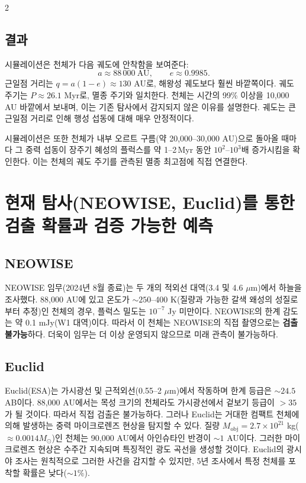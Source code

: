 \documentclass[12pt,a4paper]{article}
\begin{document}
\begin{multicols}{2}
		\subsection{결과}
		시뮬레이션은 천체가 다음 궤도에 안착함을 보여준다:
		\[
		a \approx 88\,000\ \text{AU},\qquad e \approx 0.9985.
		\]
		근일점 거리는 \(q = a(1-e) \approx 130\) AU로, 해왕성 궤도보다 훨씬 바깥쪽이다. 궤도 주기는 \(P \approx 26.1\) Myr로, 멸종 주기와 일치한다. 천체는 시간의 99\% 이상을 10,000 AU 바깥에서 보내며, 이는 기존 탐사에서 감지되지 않은 이유를 설명한다. 궤도는 큰 근일점 거리로 인해 행성 섭동에 대해 매우 안정적이다.
		
		시뮬레이션은 또한 천체가 내부 오르트 구름(약 20,000–30,000 AU)으로 돌아올 때마다 그 중력 섭동이 장주기 혜성의 플럭스를 약 1–2 Myr 동안 \(10^2\)–\(10^3\)배 증가시킴을 확인한다. 이는 천체의 궤도 주기를 관측된 멸종 최고점에 직접 연결한다.
		
		\section{현재 탐사(NEOWISE, Euclid)를 통한 검출 확률과 검증 가능한 예측}
		\subsection{NEOWISE}
		NEOWISE 임무(2024년 8월 종료)는 두 개의 적외선 대역(3.4 및 4.6 \(\mu\)m)에서 하늘을 조사했다. 88,000 AU에 있고 온도가 \(\sim 250\)–400 K(질량과 가능한 갈색 왜성의 성질로부터 추정)인 천체의 경우, 플럭스 밀도는 \(10^{-7}\) Jy 미만이다. NEOWISE의 한계 감도는 약 0.1 mJy(W1 대역)이다. 따라서 이 천체는 NEOWISE의 직접 촬영으로는 \textbf{검출 불가능}하다. 더욱이 임무는 더 이상 운영되지 않으므로 미래 관측이 불가능하다.
		
		\subsection{Euclid}
		Euclid(ESA)는 가시광선 및 근적외선(0.55–2 \(\mu\)m)에서 작동하며 한계 등급은 \(\sim 24.5\) AB이다. 88,000 AU에서는 목성 크기의 천체라도 가시광선에서 겉보기 등급이 \(>35\)가 될 것이다. 따라서 직접 검출은 불가능하다. 그러나 Euclid는 거대한 컴팩트 천체에 의해 발생하는 중력 마이크로렌즈 현상을 탐지할 수 있다. 질량 \(M_{\text{obj}} = 2.7\times10^{21}\) kg(\(\approx 0.0014 M_{\odot}\))인 천체는 90,000 AU에서 아인슈타인 반경이 \(\sim 1\) AU이다. 그러한 마이크로렌즈 현상은 수주간 지속되며 특징적인 광도 곡선을 생성할 것이다. Euclid의 광시야 조사는 원칙적으로 그러한 사건을 감지할 수 있지만, 5년 조사에서 특정 천체를 포착할 확률은 낮다(\(\sim 1\%\)).
		

\end{multicols}
\end{document}
